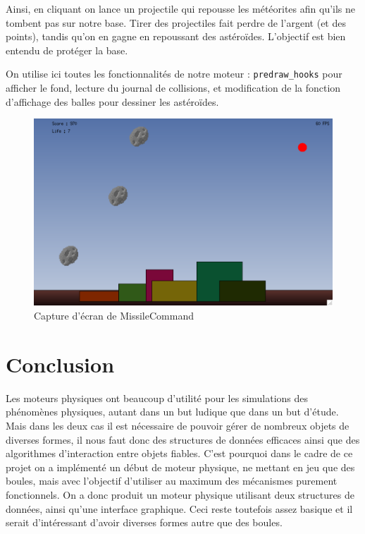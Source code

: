 \documentclass[a4paper]{scrartcl}
\begin{document}
Ainsi, en cliquant on lance un projectile qui repousse les météorites
afin qu'ils ne tombent pas sur notre base. Tirer des projectiles fait
perdre de l'argent (et des points), tandis qu'on en gagne en
repoussant des astéroïdes. L'objectif est bien entendu de protéger la
base.

On utilise ici toutes les fonctionnalités de notre moteur :
\texttt{predraw\_hooks} pour afficher le fond, lecture du journal de
collisions, et modification de la fonction d'affichage des balles pour
dessiner les astéroïdes.

\begin{figure}[h]
  \centering
  \includegraphics[scale = 0.4]{missilecommand.pdf}
  \caption{Capture d'écran de MissileCommand}
  
\end{figure}

\section*{Conclusion}

Les moteurs physiques ont beaucoup d'utilité pour les simulations des
phénomènes physiques, autant dans un but ludique que dans un but
d'étude. Mais dans les deux cas il est nécessaire de pouvoir gérer de
nombreux objets de diverses formes, il nous faut donc des structures
de données efficaces ainsi que des algorithmes d'interaction entre
objets fiables. C'est pourquoi dans le cadre de ce projet on a
implémenté un début de moteur physique, ne mettant en jeu que des
boules, mais avec l'objectif d'utiliser au maximum des mécanismes
purement fonctionnels. On a donc produit un moteur physique utilisant
deux structures de données, ainsi qu'une interface graphique. Ceci
reste toutefois assez basique et il serait d'intéressant d'avoir
diverses formes autre que des boules.
\end{document}
